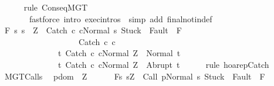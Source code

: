 \begin{isabellebody}
\ \ \ \ \isamarkupfalse%
\ {\isacharparenleft}rule\ ConseqMGT{\isacharparenright}\isanewline
\ \ \ \ \ \ \ {\isacharparenleft}fastforce\ intro{\isacharcolon}\ exec{\isachardot}intros\ \ simp\ add{\isacharcolon}\ final{\isacharunderscore}notin{\isacharunderscore}def{\isacharparenright}\isanewline
\ \ \isamarkupfalse%
\isanewline
\ \ \isamarkupfalse%
\ {\isachardoublequoteopen}{\isasymGamma}{\isacharcomma}{\isasymTheta}{\isasymturnstile}\isactrlbsub {\isacharslash}F\isactrlesub \ {\isacharbraceleft}s{\isachardot}\ s\ {\isacharequal}\ Z\ {\isasymand}\ {\isasymGamma}{\isasymturnstile}{\isasymlangle}Catch\ c\ cNormal\ s{\isasymrangle}\ {\isasymRightarrow}{\isasymnotin}{\isacharparenleft}{\isacharbraceleft}Stuck{\isacharbraceright}\ {\isasymunion}\ Fault\ {\isacharbackquote}\ {\isacharparenleft}{\isacharminus}F{\isacharparenright}{\isacharparenright}{\isacharbraceright}\ \isanewline
\ \ \ \ \ \ \ \ \ \ \ \ \ \ \ \ \ \ \ Catch\ c\ c\isanewline
\ \ \ \ \ \ \ \ \ \ \ \ \ \ {\isacharbraceleft}t{\isachardot}\ {\isasymGamma}{\isasymturnstile}{\isasymlangle}Catch\ c\ cNormal\ Z{\isasymrangle}\ {\isasymRightarrow}\ Normal\ t{\isacharbraceright}{\isacharcomma}\isanewline
\ \ \ \ \ \ \ \ \ \ \ \ \ \ {\isacharbraceleft}t{\isachardot}\ {\isasymGamma}{\isasymturnstile}{\isasymlangle}Catch\ c\ cNormal\ Z{\isasymrangle}\ {\isasymRightarrow}\ Abrupt\ t{\isacharbraceright}{\isachardoublequoteclose}\isanewline
\ \ \ \ \isamarkupfalse%
\ {\isacharparenleft}rule\ hoarep{\isachardot}Catch{\isacharparenright}\isanewline
{}\isamarkupfalse%
%
\endisatagproof
{\isafoldproof}%
%
\isadelimproof
\isanewline
%
\endisadelimproof
\isanewline
{}\isamarkupfalse%
\ MGT{\isacharunderscore}Calls{\isacharcolon}\ \isanewline
\ {\isachardoublequoteopen}{\isasymforall}p{\isasymin}dom\ {\isasymGamma}{\isachardot}\ {\isasymforall}Z{\isachardot}\ \isanewline
\ \ \ \ \ {\isasymGamma}{\isacharcomma}{\isacharbraceleft}{\isacharbraceright}{\isasymturnstile}\isactrlbsub {\isacharslash}F\isactrlesub {\isacharbraceleft}s{\isachardot}\ s{\isacharequal}Z\ {\isasymand}\ {\isasymGamma}{\isasymturnstile}{\isasymlangle}Call\ p{\isacharcomma}Normal\ s{\isasymrangle}\ {\isasymRightarrow}{\isasymnotin}{\isacharparenleft}{\isacharbraceleft}Stuck{\isacharbraceright}\ {\isasymunion}\ Fault\ {\isacharbackquote}\ {\isacharparenleft}{\isacharminus}F{\isacharparenright}{\isacharparenright}{\isacharbraceright}\isanewline

\end{isabellebody}
